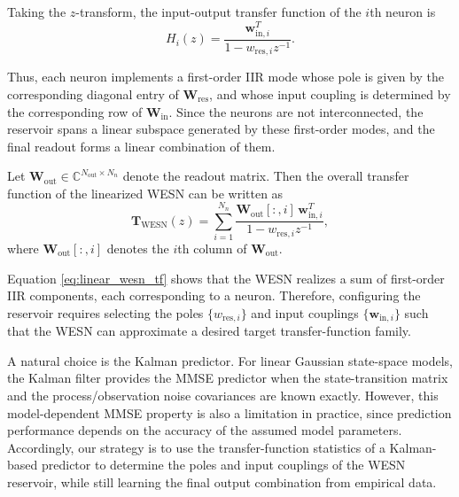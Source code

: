 \documentclass[lettersize,journal]{IEEEtran}
\begin{document}
Taking the $z$-transform, the input-output transfer function of the $i$th neuron is
\begin{equation}
H_i(z)
=
\frac{\mathbf{w}_{\mathrm{in},i}^T}{1 - w_{\mathrm{res},i} z^{-1}}.
\end{equation}

Thus, each neuron implements a first-order IIR mode whose pole is given by the corresponding diagonal entry of $\mathbf{W}_{\mathrm{res}}$, and whose input coupling is determined by the corresponding row of $\mathbf{W}_{\mathrm{in}}$. 
Since the neurons are not interconnected, the reservoir spans a linear subspace generated by these first-order modes, and the final readout forms a linear combination of them.

Let $\mathbf{W}_{\mathrm{out}} \in \mathbb{C}^{N_{\mathrm{out}} \times N_n}$ denote the readout matrix. Then the overall transfer function of the linearized WESN can be written as
\begin{equation}
\mathbf{T}_{\mathrm{WESN}}(z)
=
\sum_{i=1}^{N_n}
\frac{
\mathbf{W}_{\mathrm{out}}[:,i] \, \mathbf{w}_{\mathrm{in},i}^T
}{
1 - w_{\mathrm{res},i} z^{-1}
},
\label{eq:linear_wesn_tf}
\end{equation}
where $\mathbf{W}_{\mathrm{out}}[:,i]$ denotes the $i$th column of $\mathbf{W}_{\mathrm{out}}$.

Equation \eqref{eq:linear_wesn_tf} shows that the WESN realizes a sum of first-order IIR components, each corresponding to a neuron. 
Therefore, configuring the reservoir requires selecting the poles $\{w_{\mathrm{res},i}\}$ and input couplings $\{\mathbf{w}_{\mathrm{in},i}\}$ such that the WESN can approximate a desired target transfer-function family.

A natural choice is the Kalman predictor. For linear Gaussian state-space models, the Kalman filter provides the MMSE predictor when the state-transition matrix and the process/observation noise covariances are known exactly. 
However, this model-dependent MMSE property is also a limitation in practice, since prediction performance depends on the accuracy of the assumed model parameters. 
Accordingly, our strategy is to use the transfer-function statistics of a Kalman-based predictor to determine the poles and input couplings of the WESN reservoir, while still learning the final output combination from empirical data.
\end{document}
